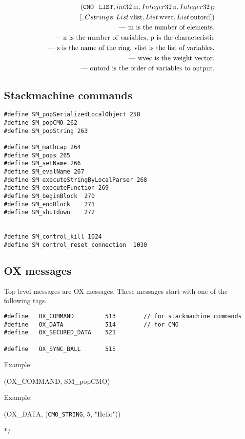 \begin{eqnarray*}
                 & & \ ({\tt CMO\_LIST}, {\sl int32}\, \mbox{m},
                  {\sl Integer32}\,  \mbox{n}, {\sl Integer32}\,\mbox{p} \\
                 & & \ \ [,{\sl Cstring}\,\mbox{s}, {\sl List}\, \mbox{vlist},
                          {\sl List}\, \mbox{wvec}, {\sl List}\, \mbox{outord}]) \\
                 & & \mbox{ --- m is the number of elements.} \\
                 & & \mbox{ --- n is the number of variables, p is the characteristic} \\
                 & & \mbox{ --- s is the name of the ring, vlist is the list of variables.} \\
                 & & \mbox{ --- wvec is the weight vector.} \\
                 & & \mbox{ --- outord is the order of variables to output.} \\
\end{eqnarray*}


\subsection{ Stackmachine commands}

\begin{verbatim}
#define SM_popSerializedLocalObject 258
#define SM_popCMO 262
#define SM_popString 263 

#define SM_mathcap 264
#define SM_pops 265
#define SM_setName 266
#define SM_evalName 267 
#define SM_executeStringByLocalParser 268 
#define SM_executeFunction 269
#define SM_beginBlock  270
#define SM_endBlock    271
#define SM_shutdown    272


#define SM_control_kill 1024
#define SM_control_reset_connection  1030
\end{verbatim}


\subsection{OX messages}

Top level messages are OX messages.
These messages start with one of the following tags.

\begin{verbatim}
#define   OX_COMMAND         513        // for stackmachine commands
#define   OX_DATA            514        // for CMO 
#define   OX_SECURED_DATA    521

#define   OX_SYNC_BALL       515
\end{verbatim}

\noindent
Example:
\begin{center}
 (OX\_COMMAND, SM\_popCMO)
\end{center}

\noindent
Example:
\begin{center}
 (OX\_DATA, ({\tt CMO\_STRING}, 5, "Hello"))
\end{center}

*/


